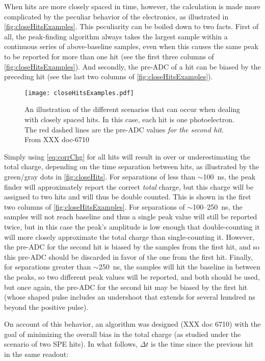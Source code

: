 \documentclass[../thesis.tex]{subfiles}
\begin{document}
When hits are more closely spaced in time, however, the calculation is made more
complicated by the peculiar behavior of the electronics, as illustrated in
\autoref{fig:closeHitsExamples}. This peculiarity can be boiled down to two
facts. First of all, the peak-finding algorithm always takes the largest sample
within a continuous series of above-baseline samples, even when this causes the
same peak to be reported for more than one hit (see the first three columns of
\autoref{fig:closeHitsExamples}). And secondly, the pre-ADC of a hit can be
biased by the preceding hit (see the last two columns of
\autoref{fig:closeHitsExamples}).

\begin{figure}[ht]
  \texttt{[image: closeHitsExamples.pdf]}
  \caption{An illustration of the different scenarios that can occur when
    dealing with closely spaced hits. In this case, each hit is one
    photoelectron. The red dashed lines are the pre-ADC values \emph{for the
      second hit}. From XXX doc-6710}
  \label{fig:closeHitsExamples}
\end{figure}

Simply using \eqref{eq:corrChg} for all hits will result in over or
underestimating the total charge, depending on the time separation between hits,
as illustrated by the green/gray dots in \autoref{fig:closeHits}. For
separations of less than $\sim$100~ns, the peak finder will approximately report
the correct \emph{total} charge, but this charge will be assigned to two hits
and will thus be double counted. This is shown in the first two columns of
\autoref{fig:closeHitsExamples}. For separations of $\sim$100--250~ns, the
samples will not reach baseline and thus a single peak value will still be
reported twice, but in this case the peak's amplitude is low enough that
double-counting it will more closely approximate the total charge than
single-counting it. However, the pre-ADC for the second hit is biased by the
samples from the first hit, and so this pre-ADC should be discarded in favor of
the one from the first hit. Finally, for separations greater than $\sim$250~ns,
the samples will hit the baseline in between the peaks, so two different peak
values will be reported, and both should be used, but once again, the pre-ADC
for the second hit may be biased by the first hit (whose shaped pulse includes
an undershoot that extends for several hundred ns beyond the positive pulse).

On account of this behavior, an algorithm was designed (XXX doc 6710) with the
goal of minimizing the overall bias in the total charge (as studied under the
scenario of two SPE hits). In what follows, $\Delta t$ is the time since the
previous hit in the same readout:
\end{document}
